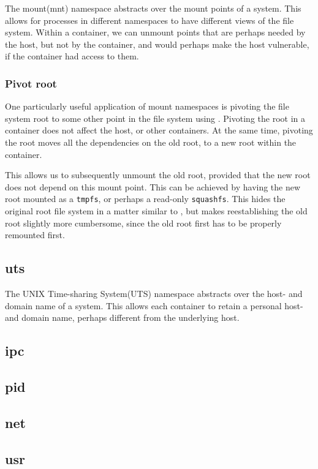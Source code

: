 The mount(mnt) namespace abstracts over the mount points of a system. This
allows for processes in different namespaces to have different views of the
file system. Within a container, we can unmount points that are perhaps needed
by the host, but not by the container, and would perhaps make the host
vulnerable, if the container had access to them.

\subsubsection{Pivot root}

One particularly useful application of mount namespaces is pivoting the file
system root to some other point in the file system using
\cite{man-2-pivot-root}. Pivoting the root in a container does not affect the
host, or other containers. At the same time, pivoting the root moves all the
dependencies on the old root, to a new root within the container.

This allows us to subsequently unmount the old root, provided that the new root
does not depend on this mount point. This can be achieved by having the new
root mounted as a \texttt{tmpfs}, or perhaps a read-only \texttt{squashfs}.
This hides the original root file system in a matter similar to
\cite{man-2-chroot}, but makes reestablishing the old root slightly more
cumbersome, since the old root first has to be properly remounted first.

\subsection{uts}

The UNIX Time-sharing System(UTS) namespace abstracts over the host- and domain
name of a system. This allows each container to retain a personal host- and
domain name, perhaps different from the underlying host.

\subsection{ipc}

\subsection{pid}

\subsection{net}

\subsection{usr}
